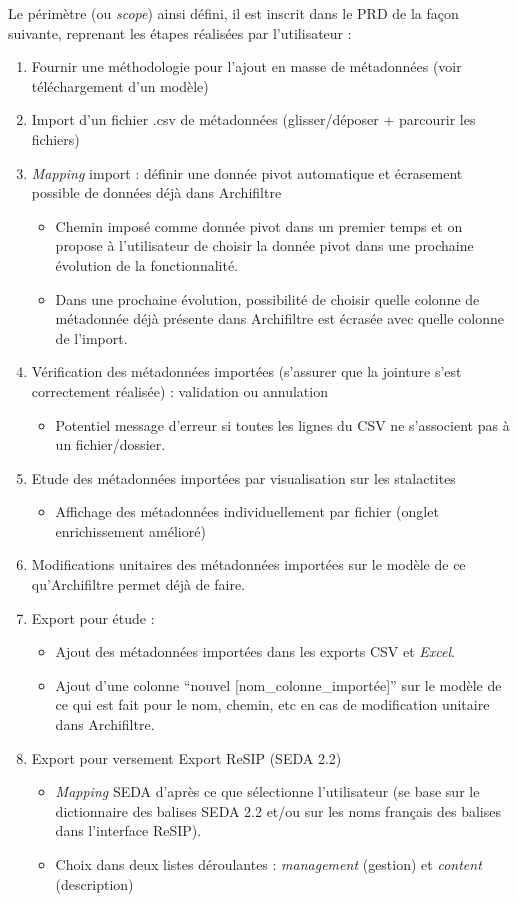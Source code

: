 Le périmètre (ou \textit{scope}) ainsi défini, il est inscrit dans le \gls{PRD} de la façon suivante, reprenant les étapes réalisées par l’utilisateur : 
\begin{enumerate}
	\item Fournir une méthodologie pour l'ajout en masse de métadonnées (voir téléchargement d'un modèle)
	\item Import d’un fichier .csv de métadonnées (glisser/déposer + parcourir les fichiers)
	\item \textit{Mapping} import : définir une donnée pivot automatique et écrasement possible de données déjà dans \gls{Archifiltre}
		\begin{itemize}
			\item Chemin imposé comme donnée pivot dans un premier temps et on propose à l’utilisateur de choisir la donnée pivot dans une prochaine évolution de la fonctionnalité.
			\item Dans une prochaine évolution, possibilité de choisir quelle colonne de métadonnée déjà présente dans \gls{Archifiltre} est écrasée avec quelle colonne de l’import.
		\end{itemize}
	\item Vérification des métadonnées importées (s'assurer que la jointure s’est correctement réalisée) : validation ou annulation 
		\begin{itemize}
			\item Potentiel message d’erreur si toutes les lignes du CSV ne s’associent pas à un fichier/dossier.
		\end{itemize}
	\item Etude des métadonnées importées par visualisation sur les stalactites 
		\begin{itemize}
			\item Affichage des métadonnées individuellement par fichier  (onglet enrichissement amélioré)	
		\end{itemize}
	\item Modifications unitaires des métadonnées importées sur le modèle de ce qu’\gls{Archifiltre} permet déjà de faire.
	\item Export pour étude : 
		\begin{itemize}
			\item Ajout des métadonnées importées dans les exports CSV et \textit{Excel}.
			\item Ajout d’une colonne \enquote{nouvel [nom\_colonne\_importée]} sur le modèle de ce qui est fait pour le nom, chemin, etc en cas de modification unitaire dans \gls{Archifiltre}.
		\end{itemize}
	\item Export pour versement Export ReSIP (SEDA 2.2)
		\begin{itemize}
		\item \textit{Mapping} \gls{SEDA} d'après ce que sélectionne l'utilisateur (se base sur le dictionnaire des balises \gls{SEDA} 2.2 et/ou sur les noms français des balises dans l’interface ReSIP).
		\item Choix dans deux listes déroulantes : \textit{management} (gestion) et \textit{content} (description)
		\end{itemize}
\end{enumerate}

